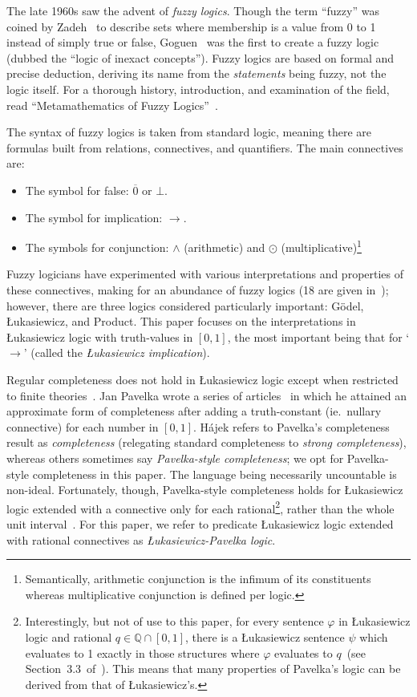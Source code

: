 \documentclass{amsart}
\theoremstyle{definition}
\numberwithin{equation}{theorem}
\renewcommand{\phi}{\varphi}
\newcommand{\Q}{\mathbb{Q}}
\newcommand{\rat}[1]{{\overline{#1}}}
\newcommand{\narrow}[1]{\xrightarrow{#1}}
\renewcommand{\to}{\narrow{}}
\newcommand{\luk}{{\L}ukasiewicz}
\begin{document}
The late 1960s saw the advent of \emph{fuzzy logics}.
Though the term ``fuzzy'' was coined by Zadeh~\cite{zadeh1965fuzzy} to describe sets where membership is a value from 0 to 1 instead of simply true or false, Goguen~\cite{goguen1969logic} was the first to create a fuzzy logic (dubbed the ``logic of inexact concepts'').
Fuzzy logics are based on formal and precise deduction, deriving its name from the \emph{statements} being fuzzy, not the logic itself.
For a thorough history, introduction, and examination of the field, read ``Metamathematics of Fuzzy Logics''~\cite{hajek1998metamathematics}.

The syntax of fuzzy logics is taken from standard logic, meaning there are formulas built from relations, connectives, and quantifiers.
The main connectives are:
\begin{itemize}
\item The symbol for false: $\rat 0$ or $\bot$.
\item The symbol for implication: $\to$.
\item The symbols for conjunction: $\wedge$ (arithmetic) and $\odot$ (multiplicative)\footnote{Semantically, arithmetic conjunction is the infimum of its constituents whereas multiplicative conjunction is defined per logic.}
\end{itemize} 
Fuzzy logicians have experimented with various interpretations and properties of these connectives, making for an abundance of fuzzy logics (18 are given in~\cite{metcalfe2008proof}); however, 
there are three logics considered particularly important: G\"odel, {\luk}, and Product.
This paper focuses on the interpretations in {\luk} logic with truth-values in $[0,1]$, the most important being that for `$\to$' (called the \emph{{\luk} implication}).

Regular completeness does not hold in {\luk} logic except when restricted to finite theories~\cite{hajek1997strong}.
Jan Pavelka wrote a series of articles~\cite{pavelka1979fuzzy} in which he attained an approximate form of completeness after adding a truth-constant (ie.\ nullary connective) for each number in $[0,1]$.
H\'ajek refers to Pavelka's completeness result as \emph{completeness} (relegating standard completeness to \emph{strong completeness}), whereas others sometimes say \emph{Pavelka-style completeness}; we opt for Pavelka-style completeness in this paper.
The language being necessarily uncountable is non-ideal. Fortunately, though, Pavelka-style completeness holds for {\luk} logic extended with a connective only for each rational\footnote{Interestingly, but not of use to this paper, for every sentence $\phi$ in {\luk} logic and rational $q\in\Q\cap[0,1]$, there is a {\luk} sentence $\psi$ which evaluates to 1 exactly in those structures where $\phi$ evaluates to $q$~(see Section~3.3~of~\cite{hajek1998metamathematics}).
This means that many properties of Pavelka's logic can be derived from that of {\luk}'s.}, rather than the whole unit interval~\cite{hajek1995fuzzy}.
For this paper, we refer to predicate {\luk} logic extended with rational connectives as \emph{{\luk}-Pavelka logic}.
\end{document}
